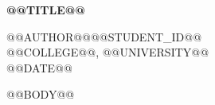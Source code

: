 \documentclass[12pt]{article}
\begin{document}
\begin{center}
  {\Large\bfseries @@TITLE@@\par}
  \vspace{0.75em}
  @@AUTHOR@@\quad @@STUDENT_ID@@\\
  @@COLLEGE@@, @@UNIVERSITY@@\\
  @@DATE@@
\end{center}
\vspace{1em}

@@BODY@@
\end{document}
